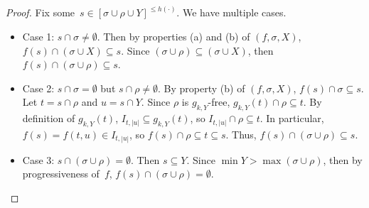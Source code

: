 \documentclass{article}
\numberwithin{theorem}{section}
\begin{document}
\begin{proof}
Fix some~$s \in [\sigma \cup \rho \cup Y]^{\leq h(\cdot)}$. We have multiple cases.
\begin{itemize}
    \item Case 1: $s \cap \sigma \neq \emptyset$. Then by properties (a) and (b) of $(f, \sigma, X)$, $f(s) \cap (\sigma \cup X) \subseteq s$. Since $(\sigma \cup \rho) \subseteq (\sigma \cup X)$, then $f(s) \cap (\sigma \cup \rho) \subseteq s$.
    \item Case 2: $s \cap \sigma = \emptyset$ but $s \cap \rho \neq \emptyset$. By property (b) of $(f, \sigma, X)$, $f(s) \cap \sigma \subseteq s$. Let $t = s \cap \rho$ and $u = s \cap Y$. Since $\rho$ is $g_{k,Y}$-free, $g_{k,Y}(t) \cap \rho \subseteq t$. By definition of $g_{k,Y}(t)$, $I_{t, |u|} \subseteq g_{k,Y}(t)$, so $I_{t, |u|} \cap \rho \subseteq t$. In particular, $f(s) = f(t, u) \in I_{t, |u|}$, so $f(s) \cap \rho \subseteq t \subseteq s$. Thus, $f(s) \cap (\sigma \cup \rho) \subseteq s$.
    \item Case 3: $s \cap (\sigma \cup \rho) = \emptyset$. Then $s \subseteq Y$. Since $\min Y > \max (\sigma \cup \rho)$, then by progressiveness of~$f$, $f(s) \cap (\sigma \cup \rho) = \emptyset$.
\end{itemize}
\end{proof}
\end{document}

